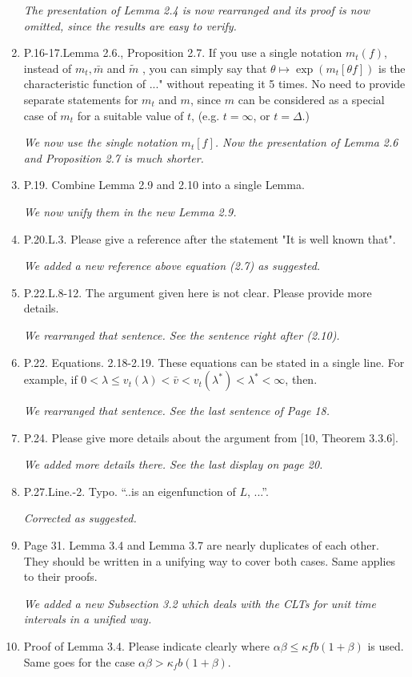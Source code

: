 \documentclass[12pt,a4paper]{amsart}
\begin{document}
\begin{enumerate}
  \emph{The presentation of Lemma 2.4 is now rearranged and its proof is now omitted, since the results are easy to verify.}
\item
  P.16-17.Lemma 2.6., Proposition 2.7.
  If you use a single notation $m_t(f)$, instead of $m_t, \bar m$ and $\tilde m$ , you can simply say that $\theta \mapsto \exp(m_t[\theta f])$ is the characteristic function of ..." without repeating it 5 times.
  No need to provide separate statements for $m_t$ and $m$, since $m$ can be considered as a special case of $m_t$ for a suitable value of $t$, (e.g. $t = \infty$, or $t = \Delta$.)

  \emph{We now use the single notation $m_t[f]$. Now the presentation of Lemma 2.6 and Proposition 2.7 is much shorter.}
\item
  P.19.
  Combine Lemma 2.9 and 2.10 into a single Lemma.

  \emph{We now unify them in the new Lemma 2.9.}
\item
  P.20.L.3.
  Please give a reference after the statement "It is well known that".

  \emph{We added a new reference above equation (2.7) as suggested.}
\item
  P.22.L.8-12.
  The argument given here is not clear.
  Please provide more details.

  \emph{We rearranged that sentence. See the sentence right after (2.10).}
\item
  P.22. Equations. 2.18-2.19.
  These equations can be stated in a single line.
  For example, if $0< \lambda \leq v_t(\lambda) < \bar v < v_t(\lambda^*)<\lambda^* < \infty$, then.

  \emph{We rearranged that sentence. See the last sentence of Page 18.}

\item
  P.24.
  Please give more details about the argument from [10, Theorem 3.3.6].

  \emph{We added more details there. See the last display on page 20.}

\item
  P.27.Line.-2.
  Typo. ``..is an eigenfunction of $L$, ...''.

  \emph{Corrected as suggested.}
\item
  Page 31. Lemma 3.4 and Lemma 3.7 are nearly duplicates of each other.
  They should be written in a unifying way to cover both cases. Same applies to their proofs.

  \emph{We added a new Subsection 3.2 which deals with the CLTs for unit time intervals in a unified way.}
\item
  Proof of Lemma 3.4. Please indicate clearly where $\alpha \beta \leq \kappa f b(1 + \beta)$ is used.
  Same goes for the case $\alpha \beta > \kappa_f b(1 + \beta)$.


\end{enumerate}
\end{document}
